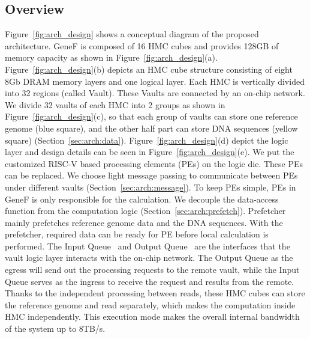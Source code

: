\documentclass[9pt,conference]{IEEEtran}
\newcommand*\circled[1]{\tikz[baseline=(char.base)]{
		\node[shape=circle,fill,inner sep=0.5pt] (char) {\textcolor{white}{#1}};}}
\begin{document}
\subsection{Overview}
\label{sec:arch:overview}
Figure~\ref{fig:arch_design} shows a conceptual diagram of the proposed architecture. GeneF is composed of 16 HMC cubes and provides 128GB of memory capacity as shown in Figure~\ref{fig:arch_design}(a). Figure~\ref{fig:arch_design}(b) depicts an HMC cube structure consisting of eight 8Gb DRAM memory layers and one logical layer. Each HMC is vertically divided into 32 regions (called Vault). These Vaults are connected by an on-chip network. We divide 32 vaults of each HMC into 2 groups as shown in Figure~\ref{fig:arch_design}(c), so that each group of vaults can store one reference genome (blue square), and the other half part can store DNA sequences (yellow square) (Section~\ref{sec:arch:data}). 
Figure~\ref{fig:arch_design}(d) depict the logic layer and design details can be seen in Figure~\ref{fig:arch_design}(e). We put the customized RISC-V based processing elements (PEs) on the logic die. These PEs can be replaced. We choose light message passing to communicate between PEs under different vaults (Section~\ref{sec:arch:message}). To keep PEs simple, PEs in GeneF is only responsible for the calculation. We decouple the data-access function from the computation logic (Section~\ref{sec:arch:prefetch}).  Prefetcher~\circled{2} mainly prefetches reference genome data and the DNA sequences. With the prefetcher, required data can be ready for PE before local calculation is performed. The Input Queue~\circled{1} and Output Queue~\circled{4} are the interfaces that the vault logic layer interacts with the on-chip network. The Output Queue as the egress will send out the processing requests to the remote vault, while the Input Queue serves as the ingress to receive the request and results from the remote. Thanks to the independent processing between reads, these HMC cubes can store the reference genome and read separately, which makes the computation inside HMC independently. This execution mode makes the overall internal bandwidth of the system up to 8TB/s. 


\end{document}
